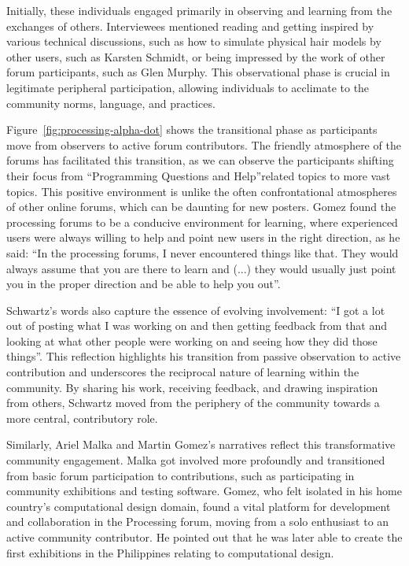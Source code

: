 Initially, these individuals engaged primarily in observing and learning from the exchanges of others. Interviewees mentioned reading and getting inspired by various technical discussions, such as how to simulate physical hair models by other users, such as Karsten Schmidt, or being impressed by the work of other forum participants, such as Glen Murphy. This observational phase is crucial in legitimate peripheral participation, allowing individuals to acclimate to the community norms, language, and practices.

Figure~\ref{fig:processing-alpha-dot} shows the transitional phase as participants move from observers to active forum contributors. The friendly atmosphere of the forums has facilitated this transition, as we can observe the participants shifting their focus from \enquote{Programming Questions and Help}related topics to more vast topics. This positive environment is unlike the often confrontational atmospheres of other online forums, which can be daunting for new posters. Gomez found the processing forums to be a conducive environment for learning, where experienced users were always willing to help and point new users in the right direction, as he said: \enquote{In the processing forums, I never encountered things like that. They would always assume that you are there to learn and (...) they would usually just point you in the proper direction and be able to help you out}.

Schwartz’s words also capture the essence of evolving involvement: \enquote{I got a lot out of posting what I was working on and then getting feedback from that and looking at what other people were working on and seeing how they did those things}. This reflection highlights his transition from passive observation to active contribution and underscores the reciprocal nature of learning within the community. By sharing his work, receiving feedback, and drawing inspiration from others, Schwartz moved from the periphery of the community towards a more central, contributory role.

Similarly, Ariel Malka and Martin Gomez’s narratives reflect this transformative community engagement. Malka got involved more profoundly and transitioned from basic forum participation to contributions, such as participating in community exhibitions and testing software. Gomez, who felt isolated in his home country’s computational design domain, found a vital platform for development and collaboration in the Processing forum, moving from a solo enthusiast to an active community contributor. He pointed out that he was later able to create the first exhibitions in the Philippines relating to computational design.

